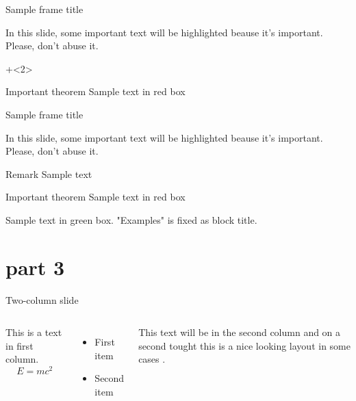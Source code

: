 \begin{frame}[t]{Sample frame title}{}
	
	In this slide, some important text will be
	\alert<2->{highlighted} beause it's important.
	Please, don't abuse it.
	
	
	
	\onslide+<2>{	%
	\begin{alertblock}{Important theorem}
	Sample text in red box
	\end{alertblock}
	}
	
\end{frame}

\begin{frame}[plain]{Sample frame title}{}
	
	In this slide, some important text will be
	\alert{highlighted} beause it's important.
	Please, don't abuse it.
	
	\begin{block}{Remark}
	Sample text
	\end{block}
	
	\begin{alertblock}{Important theorem}
	Sample text in red box
	\end{alertblock}
	
	\begin{examples}
	Sample text in green box. "Examples" is fixed as block title.
	\end{examples}
\end{frame}

\section{part 3}

\begin{frame}{Two-column slide}{}
	\begin{columns}[t]
		This is a text in first column.
		$$E=mc^2$$
		\begin{itemize}
		\item First item
		\item Second item
		\end{itemize}
		
		This text will be in the second column
		and on a second tought this is a nice looking
		layout in some cases \citep{Venzmer2018}.
	\end{columns}
\end{frame}

